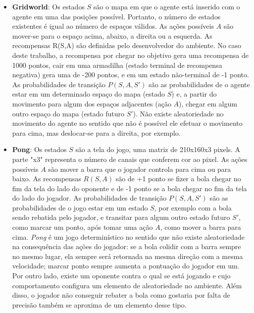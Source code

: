 \begin{itemize}
\item \textbf{Gridworld}:
Os estados $S$ são o mapa em que o agente está inserido com o agente em uma das posições possível.
Portanto, o número de estados existentes é igual ao número de espaços válidos.
As ações possíveis $A$ são mover-se para o espaço acima, abaixo, a direita ou a esquerda.
As recompensas R(S,A) são definidas pelo desenvolvedor do ambiente.
No caso deste trabalho, a recompensa por chegar no objetivo gera uma recompensa de 1000 pontos, cair em uma armadilha (estado terminal de recompensa negativa) gera uma de -200 pontos, e em um estado não-terminal de -1 ponto.
As probabilidades de transição $P(S,A,S')$ são as probabilidades de o agente estar em um determinado espaço do mapa (estado $S$) e, a partir do movimento para algum dos espaços adjacentes (ação $A$), chegar em algum outro espaço do mapa (estado futuro $S'$).
Não existe aleatoriedade no movimento do agente no sentido que não é possível ele efetuar o movimento para cima, mas deslocar-se para a direita, por exemplo.

\item \textbf{Pong}:
Os estados $S$ são a tela do jogo, uma matriz de 210x160x3 pixels.
A parte "x3"{} representa o número de canais que conferem cor ao pixel.
As ações possíveis $A$ são mover a barra que o jogador controla para cima ou para baixo.
As recompensas $R(S,A)$ são de +1 ponto se fizer a bola chegar no fim da tela do lado do oponente e de -1 ponto se a bola chegar no fim da tela do lado do jogador.
As probabilidades de transição $P(S,A,S')$ são as probabilidades de o jogo estar em um estado $S$, por exemplo com a bola sendo rebatida pelo jogador, e transitar para algum outro estado futuro $S'$, como marcar um ponto, após tomar uma ação $A$, como mover a barra para cima.
\textit{Pong} é um jogo determinístico no sentido que não existe aleatoriedade na consequência das ações do jogador: se a bola colidir com a barra sempre no mesmo lugar, ela sempre será retornada na mesma direção com a mesma velocidade; marcar ponto sempre aumenta a pontuação do jogador em um.
Por outro lado, existe um oponente contra o qual se está jogando e cujo comportamento configura um elemento de aleatoriedade no ambiente.
Além disso, o jogador não conseguir rebater a bola como gostaria por falta de precisão também se aproxima de um elemento desse tipo.


\end{itemize}
